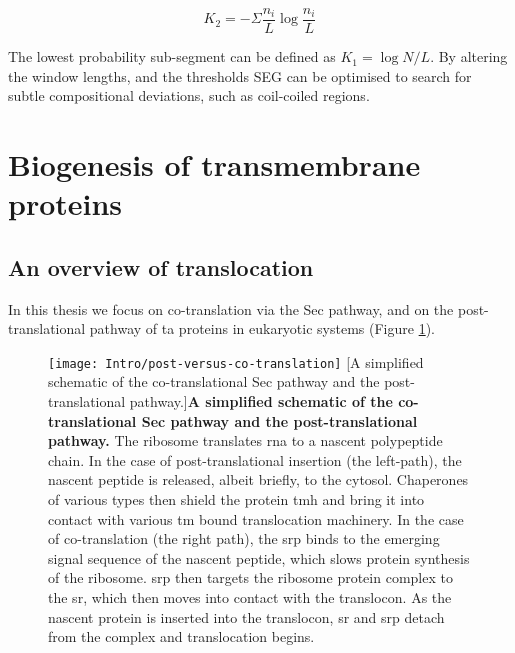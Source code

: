 \begin{equation} \label{shannonentropyliketerm}
{K}_{2}=-\Sigma\frac{n_i}{L}\log\frac{n_i}{L}
\end{equation}

The lowest probability sub-segment can be defined as $ K_1=\log N/L $.
By altering the window lengths, and the thresholds SEG can be optimised to search for subtle compositional deviations, such as coil-coiled regions.


\section{Biogenesis of transmembrane proteins}
\subsection{An overview of translocation}
In this thesis we focus on co\--translation via the Sec pathway, and on the post\--translational pathway of \gls{ta} proteins in eukaryotic systems (Figure \ref{fig:post-versus-co-translation}).

\begin{figure}[ht]
\centering
\texttt{[image: Intro/post-versus-co-translation]}
		[A simplified schematic of the co\--translational Sec pathway and the post\--translational pathway.]{\textbf{A simplified schematic of the co\--translational Sec pathway and the post\--translational pathway.}
		The ribosome translates \gls{rna} to a nascent polypeptide chain.
		In the case of post\--translational insertion (the left\--path), the nascent peptide is released, albeit briefly, to the cytosol.
		Chaperones of various types then shield the protein \gls{tmh} and bring it into contact with various \gls{tm} bound translocation machinery.
		In the case of co\--translation (the right path), the \gls{srp} binds to the emerging signal sequence of the nascent peptide, which slows protein synthesis of the ribosome.
		\gls{srp} then targets the ribosome protein complex to the \gls{sr}, which then moves into contact with the translocon.
		As the nascent protein is inserted into the translocon, \gls{sr} and \gls{srp} detach from the complex and translocation begins.
		}
\label{fig:post-versus-co-translation}
\end{figure}

